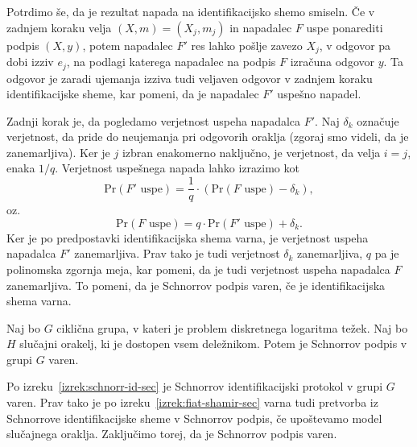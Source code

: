 \documentclass[isrm2, tisk]{fmfdelo}
\begin{document}
\begin{dokaz}
    Potrdimo še, da je rezultat napada na identifikacijsko shemo smiseln. Če v zadnjem koraku velja
    $(X, m) = (X_j, m_j)$ in napadalec $F$ uspe ponarediti podpis $(X, y)$, potem napadalec $F'$
    res lahko pošlje zavezo $X_j$, v odgovor pa dobi izziv $e_j$, na podlagi katerega napadalec na
    podpis $F$ izračuna odgovor $y$. Ta odgovor je zaradi ujemanja izziva tudi veljaven odgovor
    v zadnjem koraku identifikacijske sheme, kar pomeni, da je napadalec $F'$ uspešno napadel.

    Zadnji korak je, da pogledamo verjetnost uspeha napadalca $F'$. Naj $\delta_k$ označuje verjetnost,
    da pride do neujemanja pri odgovorih oraklja (zgoraj smo videli, da je zanemarljiva). Ker je $j$
    izbran enakomerno naključno, je verjetnost, da velja $i=j$, enaka $1/q$. Verjetnost uspešnega
    napada lahko izrazimo kot
    $$
    \text{Pr}(F' \text{ uspe}) = \frac{1}{q} \cdot (\text{Pr}(F \text{ uspe}) - \delta_k),
    $$
    oz.
    $$
    \text{Pr}(F \text{ uspe}) = q \cdot \text{Pr}(F' \text{ uspe}) + \delta_k.
    $$
    Ker je po predpostavki identifikacijska shema varna, je verjetnost uspeha napadalca $F'$
    zanemarljiva. Prav tako je tudi verjetnost $\delta_k$ zanemarljiva, $q$ pa je polinomska zgornja
    meja, kar pomeni, da je tudi verjetnost uspeha napadalca $F$ zanemarljiva. To pomeni, da je
    Schnorrov podpis varen, če je identifikacijska shema varna.
\end{dokaz}

\begin{izrek}
    Naj bo $G$ ciklična grupa, v kateri je problem diskretnega logaritma težek. Naj bo $H$ slučajni
    orakelj, ki je dostopen vsem deležnikom. Potem je Schnorrov podpis v grupi $G$ varen.
\end{izrek}

\begin{dokaz}
    Po izreku~\ref{izrek:schnorr-id-sec} je Schnorrov identifikacijski protokol v grupi $G$ varen.
    Prav tako je po izreku~\ref{izrek:fiat-shamir-sec} varna tudi pretvorba iz Schnorrove identifikacijske
    sheme v Schnorrov podpis, če upoštevamo model slučajnega oraklja. Zaključimo torej, da je
    Schnorrov podpis varen.
\end{dokaz}
\end{document}
